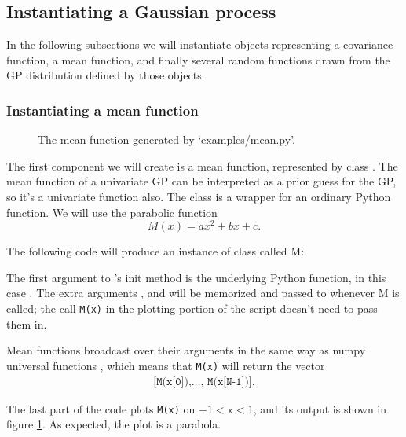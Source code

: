 \documentclass[]{manual}
\begin{document}
\subsection{Instantiating a Gaussian process}\label{sub:inst}

In the following subsections we will instantiate objects representing a covariance function, a mean function, and finally several random functions drawn from the GP distribution defined by those objects.

\subsubsection{Instantiating a mean function}\label{subsub:mean}

\begin{figure}
    \centering
    \caption{The mean function generated by {\sffamily `examples/mean.py'}.}
    \label{fig:mean}
\end{figure}

The first component we will create is a mean function, represented by class . The mean function of a univariate GP can be interpreted as a prior guess for the GP, so it's a univariate function also. The  class is a wrapper for an ordinary Python function. We will use the parabolic function
\begin{equation}
    M(x) = ax^2 + bx + c.
\end{equation}

The following code will produce an instance of class  called M:


The first argument to 's init method is the underlying Python function, in this case . The extra arguments ,   and  will be memorized and passed to  whenever M is called; the call \texttt{M(x)} in the plotting portion of the script doesn't need to pass them in.

Mean functions broadcast over their arguments in the same way as numpy universal functions \cite{numpybook}, which means that \texttt{M(x)} will return the vector
\begin{eqnarray*}
    \texttt{[M(x[0]),\ldots, M(x[N-1])]}.
\end{eqnarray*}

The last part of the code plots \texttt{M(x)} on $-1<\texttt{x}<1$, and its output is shown in figure \ref{fig:mean}. As expected, the plot is a parabola.
\end{document}
